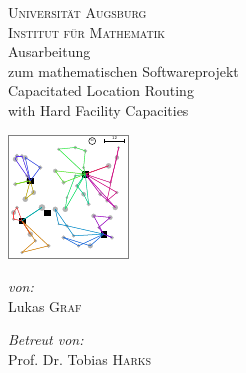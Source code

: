 \documentclass[a4paper,ngerman,11pt,bibtotoc]{scrartcl}
\theoremstyle{definition}
\theoremstyle{plain}
\theoremstyle{remark}
\begin{document}
\author{Lukas Graf}
\date{Letzte Aktualisierung: \today}

\thispagestyle{empty}


\begin{titlepage}\center
	\textsc{\LARGE Universität Augsburg}\\[1cm]
	
	\textsc{\Large Institut für Mathematik}\\[1.5cm]
	
	{\Large Ausarbeitung \\[1cm]}
	zum mathematischen Softwareprojekt\\[1cm]
	{\huge Capacitated Location Routing \\ with Hard Facility Capacities}

	\begin{center}
		\includegraphics[width=.6\textwidth]{bilder/title.pdf}
	\end{center}		
	
	\vfill
	
	\begin{minipage}{0.4\textwidth}
		\begin{flushleft} \large
			\emph{von:}\\
			Lukas \textsc{Graf}
		\end{flushleft}
	\end{minipage}
	\begin{minipage}{0.4\textwidth}
		\begin{flushright} \large
			\emph{Betreut von:} \\
			Prof. Dr. Tobias \textsc{Harks}
		\end{flushright}
	\end{minipage}
	
\end{titlepage}
\end{document}
